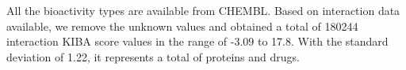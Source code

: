 \iffalse
\begin{equation}
    \tau= \frac{(a−b)}{n(n − 1)/2}   
    \label{eq:tau}
  \end{equation}
  { Here {a} and {b} represent the number of concordant pairs and discordant pairs respectively. }
\fi


All the bioactivity types are available from CHEMBL\cite{Gaulton2017}. Based on interaction data available, we remove the unknown values and obtained a total of 180244 interaction KIBA score values in the range of -3.09 to 17.8. With the standard deviation of 1.22, it represents a total of  proteins and  drugs.
